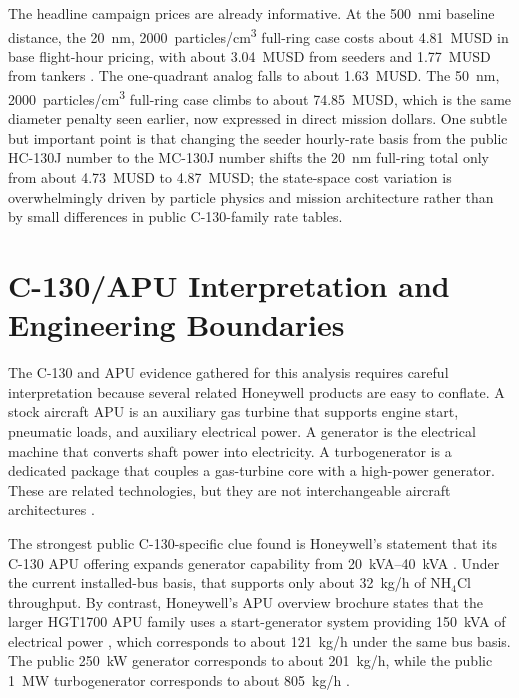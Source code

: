 \documentclass[8pt,twocolumn]{extarticle}
\begin{document}
\vspace{0.25em}
The headline campaign prices are already informative. At the \SI{500}{nmi} baseline distance, the \SI{20}{nm}, \SI{2000}{particles/cm^3} full-ring case costs about \SI{4.81}{MUSD} in base flight-hour pricing, with about \SI{3.04}{MUSD} from seeders and \SI{1.77}{MUSD} from tankers \citep{AeolusCostNote,DoDFY2026Rates}. The one-quadrant analog falls to about \SI{1.63}{MUSD}. The \SI{50}{nm}, \SI{2000}{particles/cm^3} full-ring case climbs to about \SI{74.85}{MUSD}, which is the same diameter penalty seen earlier, now expressed in direct mission dollars. One subtle but important point is that changing the seeder hourly-rate basis from the public HC-130J number to the MC-130J number shifts the \SI{20}{nm} full-ring total only from about \SI{4.73}{MUSD} to \SI{4.87}{MUSD}; the state-space cost variation is overwhelmingly driven by particle physics and mission architecture rather than by small differences in public C-130-family rate tables.

\section*{C-130/APU Interpretation and Engineering Boundaries}

The C-130 and APU evidence gathered for this analysis requires careful interpretation because several related Honeywell products are easy to conflate. A stock aircraft APU is an auxiliary gas turbine that supports engine start, pneumatic loads, and auxiliary electrical power. A generator is the electrical machine that converts shaft power into electricity. A turbogenerator is a dedicated package that couples a gas-turbine core with a high-power generator. These are related technologies, but they are not interchangeable aircraft architectures \citep{AeolusAircraftPower}.

\vspace{0.25em}
The strongest public C-130-specific clue found is Honeywell's statement that its C-130 APU offering expands generator capability from \SIrange{20}{40}{kVA} \citep{HoneywellC130}. Under the current installed-bus basis, that supports only about \SI{32}{kg/h} of NH$_4$Cl throughput. By contrast, Honeywell's APU overview brochure states that the larger HGT1700 APU family uses a start-generator system providing \SI{150}{kVA} of electrical power \citep{HoneywellAPUBrochure}, which corresponds to about \SI{121}{kg/h} under the same bus basis. The public \SI{250}{kW} generator corresponds to about \SI{201}{kg/h}, while the public \SI{1}{MW} turbogenerator corresponds to about \SI{805}{kg/h} \citep{Honeywell250kW,HoneywellHAL,Honeywell1MWMilestone}.
\end{document}
